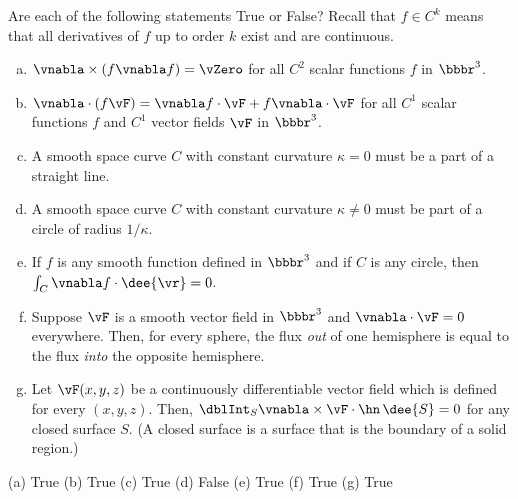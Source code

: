 \begin{question}[M317 2016D] %
Are each of the following statements True or False? 
Recall that $f \in C^k$ means that all derivatives of $f$ up to order 
$k$ exist and are continuous.

\begin{enumerate}[(a)]
\item
$\vnabla\times(f \vnabla f ) = \vZero$ for all $C^2$ scalar functions $f$ 
in $\bbbr^3$.

\item
$\vnabla\cdot(f\vF) = \vnabla f \cdot\vF + f\vnabla\cdot \vF $
for all $C^1$ scalar functions $f$ and $C^1$ vector fields $\vF$ in $\bbbr^3$.

\item
A smooth space curve $C$ with constant curvature $\kappa = 0$ must be a
part of a straight line.

\item
A smooth space curve $C$ with constant curvature $\kappa \ne 0$ must be 
part of a circle of radius $1/\kappa$.

\item
If $f$ is any smooth function defined in $\bbbr^3$ and if $C$ is any 
circle, then $\int_C\vnabla f\cdot\dee{\vr}=0$.


\item
Suppose $\vF$ is a smooth vector field in $\bbbr^3$ and $\vnabla\cdot\vF=0$
everywhere. Then, for every sphere, the flux \emph{out} of one hemisphere 
is equal to the flux \emph{into} the opposite hemisphere.

\item
Let $\vF(x, y,z)$ be a continuously differentiable vector field which is 
defined for every $(x, y, z)$. Then, 
$\dblInt_S\vnabla\times\vF\cdot\hn\,\dee{S}=0$ for any closed surface $S$.
(A closed surface is a surface that is the boundary of a solid region.)

\end{enumerate}
\end{question}

%

\begin{answer} 
(a) True\qquad
(b) True\qquad
(c) True\qquad
(d) False\qquad
(e) True\qquad
(f) True\qquad
(g) True
\end{answer}

